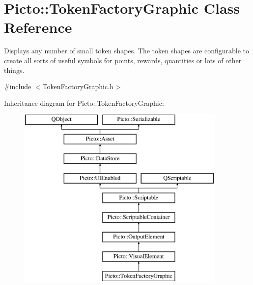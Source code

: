 \hypertarget{class_picto_1_1_token_factory_graphic}{\section{Picto\-:\-:Token\-Factory\-Graphic Class Reference}
\label{class_picto_1_1_token_factory_graphic}
}


Displays any number of small token shapes. The token shapes are configurable to create all sorts of useful symbols for points, rewards, quantities or lots of other things.  




{\ttfamily \#include $<$Token\-Factory\-Graphic.\-h$>$}

Inheritance diagram for Picto\-:\-:Token\-Factory\-Graphic\-:\begin{figure}[H]
\begin{center}
\leavevmode
\includegraphics[height=9.000000cm]{class_picto_1_1_token_factory_graphic}
\end{center}
\end{figure}
